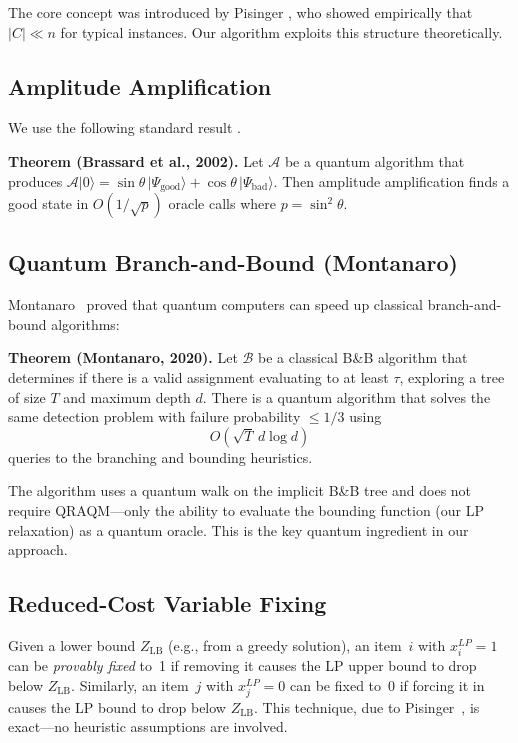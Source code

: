 \documentclass[conference]{IEEEtran}
\begin{document}
The core concept was introduced by Pisinger \cite{ref4}, who showed empirically that $|C| \ll n$ for typical instances. Our algorithm exploits this structure theoretically.

\subsection{Amplitude Amplification}

We use the following standard result \cite{ref11}.

\textbf{Theorem (Brassard et al., 2002).} Let $\mathcal{A}$ be a quantum algorithm that produces $\mathcal{A}|0\rangle = \sin\theta\,|\Psi_{\text{good}}\rangle + \cos\theta\,|\Psi_{\text{bad}}\rangle$. Then amplitude amplification finds a good state in $O(1/\sqrt{p})$ oracle calls where $p = \sin^2\theta$.

\subsection{Quantum Branch-and-Bound (Montanaro)}

Montanaro~\cite{ref24} proved that quantum computers can speed up classical branch-and-bound algorithms:

\textbf{Theorem (Montanaro, 2020).} Let $\mathcal{B}$ be a classical B\&B algorithm that determines if there is a valid assignment evaluating to at least $\tau$, exploring a tree of size $T$ and maximum depth $d$. There is a quantum algorithm that solves the same detection problem with failure probability $\le 1/3$ using
\begin{equation}
    O(\sqrt{T}\, d \log d)
    \label{eq:montanaro}
\end{equation}
queries to the branching and bounding heuristics.

The algorithm uses a quantum walk on the implicit B\&B tree and does not require QRAQM---only the ability to evaluate the bounding function (our LP relaxation) as a quantum oracle. This is the key quantum ingredient in our approach.

\subsection{Reduced-Cost Variable Fixing}

Given a lower bound $Z_{\text{LB}}$ (e.g., from a greedy solution), an item~$i$ with $x_i^{LP} = 1$ can be \textit{provably fixed} to~1 if removing it causes the LP upper bound to drop below $Z_{\text{LB}}$. Similarly, an item~$j$ with $x_j^{LP} = 0$ can be fixed to~0 if forcing it in causes the LP bound to drop below $Z_{\text{LB}}$. This technique, due to Pisinger~\cite{ref4}, is exact---no heuristic assumptions are involved.
\end{document}
